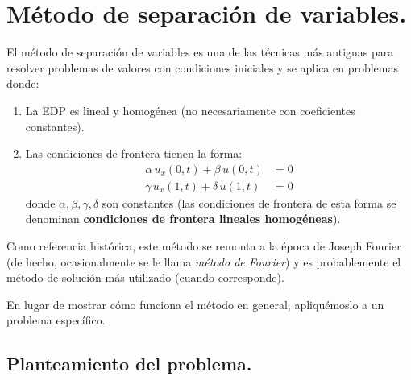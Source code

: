\section{Método de separación de variables.}

El método de separación de variables es una de las técnicas más antiguas para resolver problemas de valores con condiciones iniciales y se aplica en problemas donde:
\begin{enumerate}
\item La EDP es lineal y homogénea (no necesariamente con coeficientes constantes).
\item Las condiciones de frontera tienen la forma:
\begin{align*}
\alpha \, u_{x} (0, t) + \beta \, u (0, t) &= 0 \\
\gamma \, u_{x} (1, t) + \delta \, u (1, t) &= 0
\end{align*}
donde $\alpha, \beta, \gamma, \delta$ son constantes (las condiciones de frontera de esta forma se denominan \textbf{condiciones de frontera lineales homogéneas}).
\end{enumerate}
Como referencia histórica, este método se remonta a la época de Joseph Fourier (de hecho, ocasionalmente se le llama \emph{método de Fourier}) y es probablemente el método de solución más utilizado (cuando corresponde).
\par
En lugar de mostrar cómo funciona el método en general, apliquémoslo a un problema específico.

\subsection{Planteamiento del problema.}

